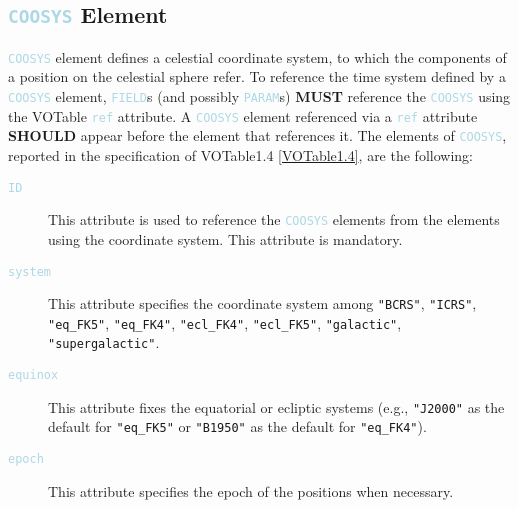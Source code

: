 \documentclass[11pt,a4paper]{ivoa}
\newcommand\elem[1]{\textcolor{LightBlue}{{\tt#1}}}
\begin{document}
\subsection{\elem{COOSYS} Element}
\elem{COOSYS} element defines a celestial coordinate system, to which the components of a position on the celestial sphere refer.
To reference the time system defined by a \elem{COOSYS} element, \elem{FIELD}s (and possibly \elem{PARAM}s) \textbf{MUST} reference the \elem{COOSYS} using the VOTable \elem{ref} attribute. A \elem{COOSYS} element referenced via a \elem{ref} attribute \textbf{SHOULD} appear before the element that references it. The elements of \elem{COOSYS}, reported in the specification of VOTable1.4 \ref{VOTable1.4}, are the following:
\begin{description}
     \item[\elem{ID}] This attribute is used to reference the \elem{COOSYS} elements from the elements using the coordinate system. This attribute is mandatory.
     \item[\elem{system}] This attribute specifies the coordinate system among \verb|"BCRS"|, \verb|"ICRS"|, \verb|"eq_FK5"|, \verb|"eq_FK4"|, \verb|"ecl_FK4"|, \verb|"ecl_FK5"|, \verb|"galactic"|, \verb|"supergalactic"|. 
     \item[\elem{equinox}] This attribute fixes the equatorial or ecliptic systems (e.g., \verb|"J2000"| as the default for \verb|"eq_FK5"| or \verb|"B1950"| as the default for \verb|"eq_FK4"|).
     \item[\elem{epoch}] This attribute specifies the epoch of the positions when necessary.
\end{description}
\end{document}
